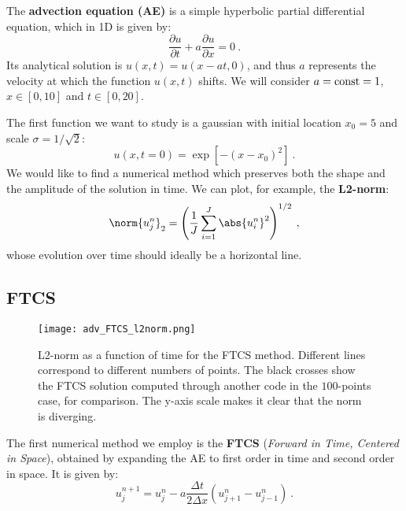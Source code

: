 The \textbf{advection equation (AE)} is a simple hyperbolic partial differential equation, which in 1D is given by:
\begin{equation}
    \frac{\partial{u}}{\partial{t}} + a \frac{\partial{u}}{\partial{x}} = 0 \:.
    \label{eq:advection}
\end{equation}
Its analytical solution is $u(x, t) = u(x-at, 0)$, and thus $a$ represents the velocity at which the function $u(x, t)$ shifts. We will consider $a={\rm const}=1$, $x \in \left[0,10\right]$ and $t \in \left[0,20\right]$.

\vspace{4mm}  

The first function we want to study is a gaussian with initial location $x_0=5$ and scale $\sigma=1/\sqrt{2}$:
\begin{equation}
    u(x, t=0) = \exp{\left[-(x-x_0)^2\right]} \:.
    \label{eq:gaussian}
\end{equation}
We would like to find a numerical method which preserves both the shape and the amplitude of the solution in time. We can plot, for example, the \textbf{L2-norm}:
\begin{equation} 
    \norm{u_j^n}_2 = \left(\frac{1}{J} \sum_{i = 1}^J \abs{u_i^n}^2\right)^{1/2} \:,
    \label{eq:l2norm}
\end{equation}
whose evolution over time should ideally be a horizontal line.




\subsection{FTCS} \label{advection_FTCS}
\begin{figure}[b!]
    \centering
    \texttt{[image: adv\_FTCS\_l2norm.png]}
    \caption{\small L2-norm as a function of time for the FTCS method. Different lines correspond to different numbers of points. The black crosses show the FTCS solution computed through another code in the $100$-points case, for comparison. The y-axis scale makes it clear that the norm is diverging.}
    \label{fig:advection_FTCS}
\end{figure}

The first numerical method we employ is the \textbf{FTCS} ({\it Forward in Time, Centered in Space}), obtained by expanding the AE to first order in time and second order in space. It is given by:
\begin{equation}
    u_j^{n+1} = u_j^n - a\frac{\Delta t}{2\Delta x} \left(u_{j+1}^n - u_{j-1}^n\right) \:.
    \label{eq:FTCS}
\end{equation}


